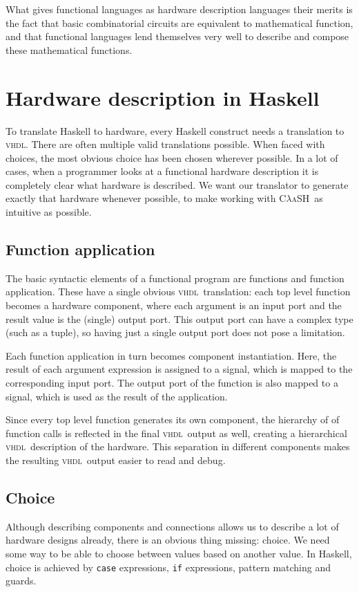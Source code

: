 \documentclass[conference,pdf,a4paper,10pt,final,twoside,twocolumn]{IEEEtran}
\def\VHDL{\textsc{vhdl}}
\def\CLaSH{\textsc{C$\lambda$aSH}}
\def\hs#1{\texttt{#1}}
\begin{document}
What gives functional languages as hardware description languages their merits is the fact that basic combinatorial circuits are equivalent to mathematical function, and that functional languages lend themselves very well to describe and compose these mathematical functions. 

\section{Hardware description in Haskell}

  To translate Haskell to hardware, every Haskell construct needs a
  translation to \VHDL. There are often multiple valid translations
  possible. When faced with choices, the most obvious choice has been
  chosen wherever possible. In a lot of cases, when a programmer looks
  at a functional hardware description it is completely clear what
  hardware is described. We want our translator to generate exactly that
  hardware whenever possible, to make working with \CLaSH\ as intuitive as
  possible.

  \subsection{Function application}
    The basic syntactic elements of a functional program are functions
    and function application. These have a single obvious \VHDL\
    translation: each top level function becomes a hardware component,
    where each argument is an input port and the result value is the
    (single) output port. This output port can have a complex type (such
    as a tuple), so having just a single output port does not pose a
    limitation.

    Each function application in turn becomes component instantiation.
    Here, the result of each argument expression is assigned to a
    signal, which is mapped to the corresponding input port. The output
    port of the function is also mapped to a signal, which is used as
    the result of the application.

    Since every top level function generates its own component, the
    hierarchy of of function calls is reflected in the final \VHDL\
    output as well, creating a hierarchical \VHDL\ description of the
    hardware.  This separation in different components makes the
    resulting \VHDL\ output easier to read and debug.

  \subsection{Choice}
    Although describing components and connections allows us to describe
    a lot of hardware designs already, there is an obvious thing
    missing: choice. We need some way to be able to choose between
    values based on another value.  In Haskell, choice is achieved by
    \hs{case} expressions, \hs{if} expressions, pattern matching and
    guards.
\end{document}
